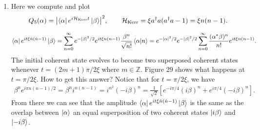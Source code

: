 \documentclass{article}
\theoremstyle{definition}
\newcommand{\ham}{\mathcal{H}}
\newcommand{\al}{\alpha}
\newcommand{\be}{\beta}
\newcommand{\f}[2]{\frac{#1}{#2}}
\newcommand{\lb}{\left[}
\newcommand{\rb}{\right]}
\begin{document}
\begin{enumerate}[label=\alph*)]
	
	\item Here we compute and plot 
	\begin{align*}
		Q_5(\al) = \abs{\bra{\al}  e^{i\ham_\text{Kerr} t}   \ket{\be}}^2, \quad\quad 
		\ham_\text{Kerr} = \xi a^\dagger a (a^\dagger a - 1) = \xi n(n-1).
	\end{align*}

	\begin{align*}
		\bra{\al} e^{it\xi \hat{n} (\hat{n}-1)} \ket{\be} =  \sum_{n=0}^\infty e^{-\abs{\be}^2/2} e^{it\xi n(n-1)} \f{\be^n}{\sqrt{n!}} \braket{\al}{n} = e^{-\abs{\al}^2/2} e^{-\abs{\be}^2/2} \sum_{n=0}^\infty \f{(\al^*\be)^n}{n!} e^{it \xi n(n-1)}.
	\end{align*}		
	The initial coherent state evolves to become two superposed coherent states whenever $t = (2m+1) \pi / 2\xi$ where $m\in \mathbb{Z}$. Figure 29 shows what happens at $t = \pi/2\xi$. How to get this answer? Notice that for $t = \pi/2\xi$, we have
	\begin{align*}
	\be^n e^{i\pi n(n-1)/2} = \be^n i^{n(n-1)} = i^{n^2} (-i\be)^n =  \f{1}{\sqrt{2}}\lb  e^{-i\pi/4} (i\be)^n + e^{i\pi/4} (-i\be)^n  \rb.
	\end{align*}
	From there we can see that the amplitude $\bra{\al} e^{it\xi \hat{n} (\hat{n}-1)} \ket{\be} $ is the same as the overlap between $\ket{\al}$ an equal superposition of two coherent states $\ket{i\be}$ and $\ket{-i\be}$.
	

\end{enumerate}
\end{document}
